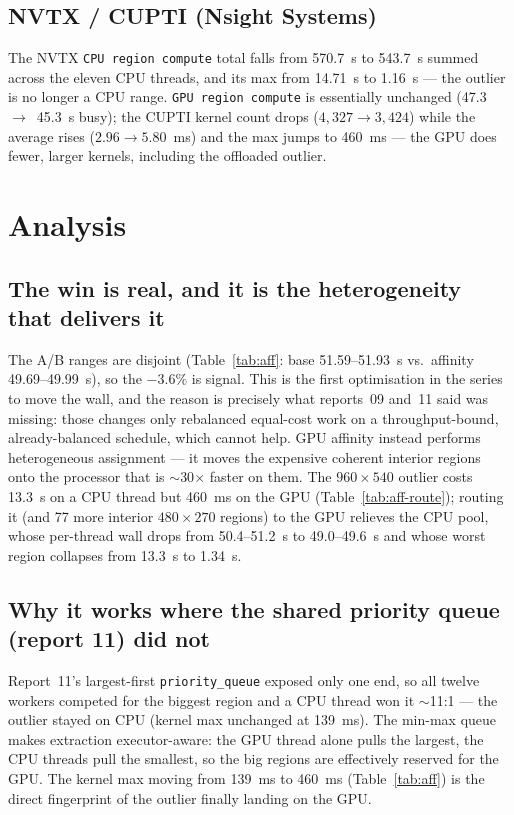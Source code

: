 \documentclass[
	english,
	letterpaper, oneside
]{article}
\begin{document}
\subsection{NVTX / CUPTI (Nsight Systems)}

The NVTX \texttt{CPU region compute} total falls from 570.7~s to 543.7~s summed
across the eleven CPU threads, and its max from 14.71~s to 1.16~s --- the
outlier is no longer a CPU range. \texttt{GPU region compute} is essentially
unchanged (47.3~$\to$~45.3~s busy); the CUPTI kernel count drops
($4{,}327\to3{,}424$) while the average rises ($2.96\to5.80$~ms) and the max
jumps to 460~ms --- the GPU does fewer, larger kernels, including the offloaded
outlier.

\section{Analysis}

\subsection{The win is real, and it is the heterogeneity that delivers it}

The A/B ranges are disjoint (Table~\ref{tab:aff}: base 51.59--51.93~s vs.\
affinity 49.69--49.99~s), so the $-3.6\%$ is signal. This is the first
optimisation in the series to move the wall, and the reason is precisely what
reports~09 and~11 said was missing: those changes only rebalanced
equal-cost work on a throughput-bound, already-balanced schedule, which cannot
help. GPU affinity instead performs heterogeneous assignment --- it moves
the expensive coherent interior regions onto the processor that is $\sim$30$\times$
faster on them. The $960\times540$ outlier costs 13.3~s on a CPU thread but
460~ms on the GPU (Table~\ref{tab:aff-route}); routing it (and 77 more interior
$480\times270$ regions) to the GPU relieves the CPU pool, whose per-thread wall
drops from 50.4--51.2~s to 49.0--49.6~s and whose worst region collapses from
13.3~s to 1.34~s.

\subsection{Why it works where the shared priority queue (report 11) did not}

Report~11's largest-first \texttt{priority\_queue} exposed only one end, so all
twelve workers competed for the biggest region and a CPU thread won it $\sim$11:1
--- the outlier stayed on CPU (kernel max unchanged at 139~ms). The min-max queue
makes extraction executor-aware: the GPU thread alone pulls the largest,
the CPU threads pull the smallest, so the big regions are effectively reserved
for the GPU. The kernel max moving from 139~ms to 460~ms (Table~\ref{tab:aff})
is the direct fingerprint of the outlier finally landing on the GPU.
\end{document}
